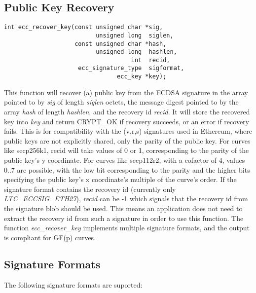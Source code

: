 \documentclass[synpaper]{book}
\begin{document}
\subsection{Public Key Recovery}
\begin{verbatim}
int ecc_recover_key(const unsigned char *sig,
                          unsigned long  siglen,
                    const unsigned char *hash,
                          unsigned long  hashlen,
                                    int  recid,
                     ecc_signature_type  sigformat,
                                ecc_key *key);
\end{verbatim}

This function will recover (a) public key from the ECDSA signature in the array pointed to by \textit{sig} of length \textit{siglen} octets, the message digest
pointed to by the array \textit{hash} of length \textit{hashlen}, and the recovery id \textit{recid}. It will store the recovered
key into \textit{key} and return CRYPT\_OK if recovery succeeds, or an error if recovery fails.
This is for compatibility with the (v,r,s) signatures used in Ethereum, where public keys are not explicitly shared,
only the parity of the public key. For curves like secp256k1, recid will take values of 0 or 1, corresponding to the
parity of the public key's y coordinate. For curves like secp112r2, with a cofactor of 4, values 0..7 are possible,
with the low bit corresponding to the parity and the higher bits specifying the public key's x coordinate's multiple
of the curve's order.
If the signature format contains the recovery id (currently only \textit{LTC\_ECCSIG\_ETH27}), \textit{recid} can be -1
which signals that the recovery id from the signature blob should be used. This means an application does not need to
extract the recovery id from such a signature in order to use this function.
The function \textit{ecc\_recover\_key} implements multiple signature formats, and the output is compliant for GF(p) curves.

\subsection{Signature Formats}
The following signature formats are suported:
\end{document}
